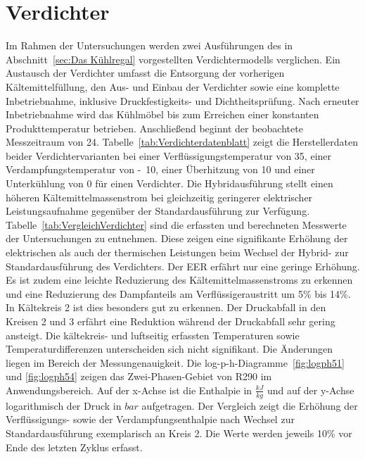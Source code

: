 \section{Verdichter}
\label{sec:Verdichter}

Im Rahmen der Untersuchungen werden zwei Ausführungen des in Abschnitt~\ref{sec:Das Kühlregal} vorgestellten Verdichtermodells verglichen. 
Ein Austausch der Verdichter umfasst die Entsorgung der vorherigen Kältemittelfüllung, den Aus- und Einbau der Verdichter sowie eine komplette Inbetriebnahme, inklusive Druckfestigkeits- und Dichtheitsprüfung. Nach erneuter Inbetriebnahme wird das Kühlmöbel bis zum Erreichen einer konstanten Produkttemperatur betrieben. Anschließend beginnt der beobachtete Messzeitraum von \unit{24}{\hour}.
Tabelle~\ref{tab:Verdichterdatenblatt} zeigt die Herstellerdaten beider Verdichtervarianten bei einer Verflüssigungstemperatur von \unit{35}{\celsius}, einer Verdampfungstemperatur von \unit{-10}{\celsius}, einer Überhitzung von \unit{10}{\kelvin} und einer Unterkühlung von \unit{0}{\kelvin} für einen Verdichter. Die Hybridausführung stellt einen höheren Kältemittelmassenstrom bei gleichzeitig geringerer elektrischer Leistungsaufnahme gegenüber der Standardausführung zur Verfügung.
Tabelle~\ref{tab:VergleichVerdichter} sind die erfassten und berechneten Messwerte der Untersuchungen zu entnehmen. Diese zeigen eine signifikante Erhöhung der elektrischen als auch der thermischen Leistungen beim Wechsel der Hybrid- zur Standardausführung des Verdichters. Der EER erfährt nur eine geringe Erhöhung. Es ist zudem eine leichte Reduzierung des Kältemittelmassenstroms zu erkennen und eine Reduzierung des Dampfanteils am Verflüssigeraustritt um \unit{5}{\%} bis \unit{14}{\%}. In Kältekreis 2 ist dies besonders gut zu erkennen. Der Druckabfall in den Kreisen 2 und 3 erfährt eine Reduktion während der Druckabfall sehr gering ansteigt. Die kältekreis- und luftseitig erfassten Temperaturen sowie Temperaturdifferenzen unterscheiden sich nicht signifikant. Die Änderungen liegen im Bereich der Messungenauigkeit.  
Die log-p-h-Diagramme~\ref{fig:logph51} und \ref{fig:logph54} zeigen das Zwei-Phasen-Gebiet von R290 im Anwendungsbereich. Auf der x-Achse ist die Enthalpie in $\frac{kJ}{kg}$ und auf der y-Achse logarithmisch der Druck in $bar$ aufgetragen. Der Vergleich zeigt die Erhöhung der Verflüssigungs- sowie der Verdampfungsenthalpie nach Wechsel zur Standardausführung exemplarisch an Kreis 2. Die Werte werden jeweils \unit{10}{\%} vor Ende des letzten Zyklus erfasst.



